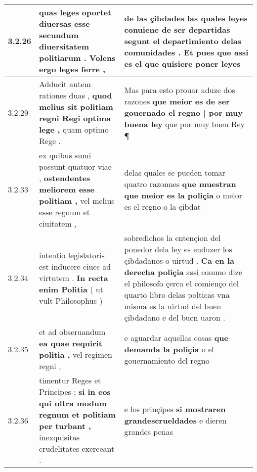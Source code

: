 \begin{tabular}{|p{1cm}|p{6.5cm}|p{6.5cm}|}
3.2.26 & quas leges oportet diuersas esse \textbf{ secundum diuersitatem politiarum . } Volens ergo leges ferre , & de las çibdades las quales leyes conuiene de ser departidas \textbf{ segunt el departimiento delas comunidades . } Et pues que assi es el que quisiere poner leyes \\\hline
3.2.29 & Adducit autem rationes duas , \textbf{ quod melius sit politiam regni Regi optima lege , } quam optimo Rege . & Mas para esto prouar aduze dos razones \textbf{ que meior es de ser gouernado el regno | por muy buena ley } que por muy buen Rey ¶ \\\hline
3.2.33 & ex quibus sumi possunt quatuor viae , \textbf{ ostendentes meliorem esse politiam , } vel melius esse regnum et ciuitatem , & delas quales se pueden tomar quatro razonnes \textbf{ que muestran que meior es la poliçia } o meior es el regno o la çibdat \\\hline
3.2.34 & intentio legislatoris est inducere ciues ad virtutem . \textbf{ In recta enim Politia } ( ut vult Philosophus ) & sobredichos la entençion del ponedor dela ley es enduzer los çibdadanos o uirtud . \textbf{ Ca en la derecha poliçia } assi commo dize el philosofo çerca el comienço del quarto libro delas polticas vna misma es la uirtud del buen çibdadano e del buen uaron . \\\hline
3.2.35 & et ad obseruandum \textbf{ ea quae requirit politia , } vel regimen regni , & e aguardar aquellas cosas \textbf{ que demanda la poliçia } o el gouernamiento del regno \\\hline
3.2.36 & timentur Reges et Principes ; \textbf{ si in eos qui ultra modum regnum et politiam per turbant , } inexquisitas crudelitates exerceant . & e los prinçipes \textbf{ si mostraren grandescrueldades } e dieren grandes penas \\\hline

\end{tabular}
